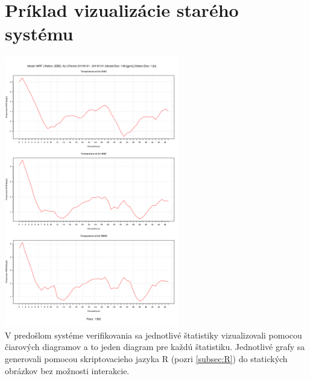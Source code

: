 \section{Príklad vizualizácie starého systému}
\label{sec:oldsys}
{ 	\centering
	\includegraphics[width=3in]{oldsys} 
} \\
V predošlom systéme verifikovania sa jednotlivé štatistiky vizualizovali pomocou čiarových diagramov a to jeden diagram pre každú štatistiku. Jednotlivé grafy sa generovali pomocou skriptovacieho jazyka R (pozri \ref{subsec:R}) do statických obrázkov bez možnosti interakcie.

